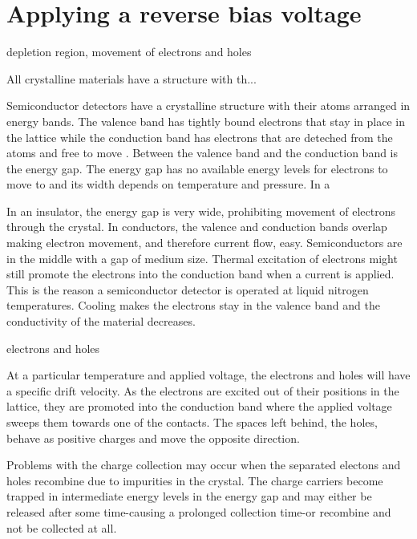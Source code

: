 
\section{Applying a reverse bias voltage}
\indent depletion region, movement of electrons and holes

All crystalline materials have a structure with th...



Semiconductor detectors have a crystalline structure with their atoms arranged in energy bands. The valence band has tightly bound electrons that stay in place in the lattice while the conduction band has electrons that are deteched from the atoms and free to move \cite{Leo}. Between the valence band and the conduction band is the energy gap. The energy gap has no available energy levels for electrons to move to and its width depends on temperature and pressure. In a 

In an insulator, the energy gap is very wide, prohibiting movement of electrons through the crystal. In conductors, the valence and conduction bands overlap making electron movement, and therefore current flow, easy. Semiconductors are in the middle with a gap of medium size. Thermal excitation of electrons might still promote the electrons into the conduction band when a current is applied. This is the reason a semiconductor detector is operated at liquid nitrogen temperatures. Cooling makes the electrons stay in the valence band and the conductivity of the material decreases. 

electrons and holes

At a particular temperature and applied voltage, the electrons and holes will have a specific drift velocity. As the electrons are excited out of their positions in the lattice, they are promoted into the conduction band where the applied voltage sweeps them towards one of the contacts. The spaces left behind, the holes, behave as positive charges and move the opposite direction. 

Problems with the charge collection may occur when the separated electons and holes recombine due to impurities in the crystal. The charge carriers become trapped in intermediate energy levels in the energy gap and may either be released after some time-causing a prolonged collection time-or recombine and not be collected at all. 
 


 